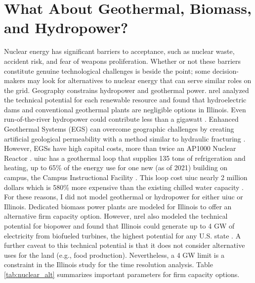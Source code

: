 \section{What About Geothermal, Biomass, and Hydropower?}
\label{section:alt_firm}

Nuclear energy has significant barriers to acceptance, such as nuclear waste,
accident risk, and fear of weapons proliferation. Whether or not these barriers
constitute genuine technological challenges is beside the point; some decision-makers
may look for alternatives to nuclear energy that can serve similar roles
on the grid. Geography constrains hydropower and geothermal power. \gls{nrel} analyzed
the technical potential for each renewable resource and found that hydroelectric dams
and conventional geothermal plants are negligible options in Illinois. Even run-of-the-river
hydropower could contribute less than a gigawatt \cite{lopez_us_2012}. Enhanced Geothermal
Systems (EGS) can overcome geographic challenges by creating artificial geological permeability
with a method similar to hydraulic fracturing \cite{geothermal_technologies_office_what_2012}.
However, EGSs have high capital costs, more than twice an AP1000 Nuclear Reactor
\cite{nrel_2020_2020}. \gls{uiuc} has a geothermal loop that supplies 135 tons of refrigeration
and heating, up to 65\% of the energy use for one new (as of 2021) building on campus,
the Campus Instructional Facility \cite{kim_geothermal_nodate}.
This loop cost \gls{uiuc} nearly 2 million dollars which is 580\% more expensive
than the existing chilled water capacity
\cite{kim_geothermal_nodate,affiliated_engineers_inc_utilities_2015}. For these
reasons, I did not model geothermal or hydropower for either \gls{uiuc} or Illinois.
Dedicated biomass power plants are modeled for Illinois to offer an alternative
firm capacity option. However, \gls{nrel} also modeled the technical potential for biopower
and found that Illinois could generate up to 4 GW of electricity from biofueled turbines, the highest potential
for any U.S. state \cite{lopez_us_2012}. A further caveat to this technical potential is that it does not
consider alternative uses for the land (e.g., food production). Nevertheless, a 4 GW limit is a constraint in the Illinois study for the time resolution analysis.
Table \ref{tab:nuclear_alt} summarizes important parameters for firm capacity options.

